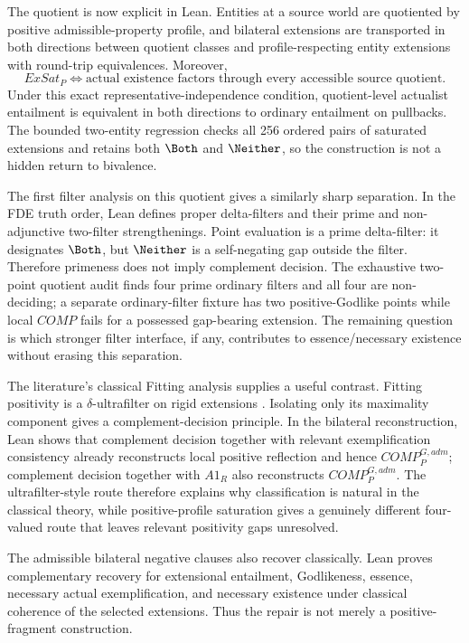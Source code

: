 The quotient is now explicit in Lean. Entities at a source world are quotiented by positive admissible-property profile, and bilateral extensions are transported in both directions between quotient classes and profile-respecting entity extensions with round-trip equivalences. Moreover,
\[
  ExSat_P
  \Longleftrightarrow
  \text{actual existence factors through every accessible source quotient}.
\]
Under this exact representative-independence condition, quotient-level actualist entailment is equivalent in both directions to ordinary entailment on pullbacks. The bounded two-entity regression checks all 256 ordered pairs of saturated extensions and retains both \(\Both\) and \(\Neither\), so the construction is not a hidden return to bivalence.

The first filter analysis on this quotient gives a similarly sharp separation. In the FDE truth order, Lean defines proper delta-filters and their prime and non-adjunctive two-filter strengthenings. Point evaluation is a prime delta-filter: it designates \(\Both\), but \(\Neither\) is a self-negating gap outside the filter. Therefore primeness does not imply complement decision. The exhaustive two-point quotient audit finds four prime ordinary filters and all four are non-deciding; a separate ordinary-filter fixture has two positive-Godlike points while local \(COMP\) fails for a possessed gap-bearing extension. The remaining question is which stronger filter interface, if any, contributes to essence/necessary existence without erasing this separation.

The literature's classical Fitting analysis supplies a useful contrast. Fitting positivity is a \(\delta\)-ultrafilter on rigid extensions \cite{BenzmuellerFuenmayor2019}. Isolating only its maximality component gives a complement-decision principle. In the bilateral reconstruction, Lean shows that complement decision together with relevant exemplification consistency already reconstructs local positive reflection and hence \(COMP_P^{G,adm}\); complement decision together with \(A1_R\) also reconstructs \(COMP_P^{G,adm}\). The ultrafilter-style route therefore explains why classification is natural in the classical theory, while positive-profile saturation gives a genuinely different four-valued route that leaves relevant positivity gaps unresolved.

The admissible bilateral negative clauses also recover classically. Lean proves complementary recovery for extensional entailment, Godlikeness, essence, necessary actual exemplification, and necessary existence under classical coherence of the selected extensions. Thus the repair is not merely a positive-fragment construction.

